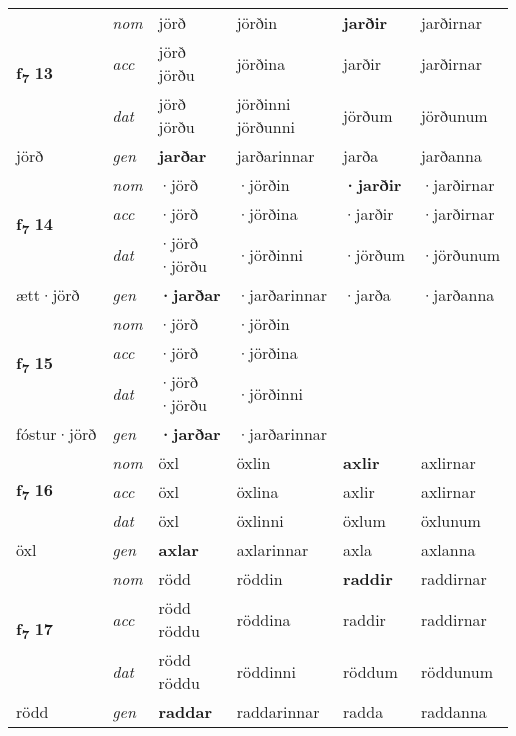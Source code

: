 \begin{longtable}[l]{X>{\footnotesize\itshape}XXXXX}
\multirow{3}{*}{{{\textbf{f{\textsubscript{7}}} \Large{\textbf{13}}}}} & nom & jörð & jörðin & \textbf{jarðir} & jarðirnar \\*
 & acc & \specialcell{jörð\\ jörðu} & jörðina & jarðir & jarðirnar \\*
 & dat & \specialcell{jörð\\ jörðu} & \specialcell{jörðinni\\ jörðunni} & jörðum & jörðunum \\*
 {\footnotesize{jörð}} & gen & \textbf{jarðar} & jarðarinnar & jarða & jarðanna \\
\midrule

\multirow{3}{*}{{{\textbf{f{\textsubscript{7}}} \Large{\textbf{14}}}}} & nom & ·jörð & ·jörðin & \textbf{·jarðir} & ·jarðirnar \\*
 & acc & ·jörð & ·jörðina & ·jarðir & ·jarðirnar \\*
 & dat & \specialcell{·jörð\\  ·jörðu} & ·jörðinni & ·jörðum & ·jörðunum \\*
 {\footnotesize{ætt\allowbreak ·jörð}} & gen & \textbf{·jarðar} & ·jarðarinnar & ·jarða & ·jarðanna \\
\midrule

\multirow{3}{*}{{{\textbf{f{\textsubscript{7}}} \Large{\textbf{15}}}}} & nom & ·jörð & ·jörðin & \textbf{} &  \\*
 & acc & ·jörð & ·jörðina &  &  \\*
 & dat & \specialcell{·jörð\\  ·jörðu} & ·jörðinni &  &  \\*
 {\footnotesize{fóstur\allowbreak ·jörð}} & gen & \textbf{·jarðar} & ·jarðarinnar &  &  \\
\midrule

\multirow{3}{*}{{{\textbf{f{\textsubscript{7}}} \Large{\textbf{16}}}}} & nom & öxl & öxlin & \textbf{axlir} & axlirnar \\*
 & acc & öxl & öxlina & axlir & axlirnar \\*
 & dat & öxl & öxlinni & öxlum & öxlunum \\*
 {\footnotesize{öxl}} & gen & \textbf{axlar} & axlarinnar & axla & axlanna \\
\midrule

\multirow{3}{*}{{{\textbf{f{\textsubscript{7}}} \Large{\textbf{17}}}}} & nom & rödd & röddin & \textbf{raddir} & raddirnar \\*
 & acc & \specialcell{rödd\\ röddu} & röddina & raddir & raddirnar \\*
 & dat & \specialcell{rödd\\ röddu} & röddinni & röddum & röddunum \\*
 {\footnotesize{rödd}} & gen & \textbf{raddar} & raddarinnar & radda & raddanna \\
\midrule


\end{longtable}
